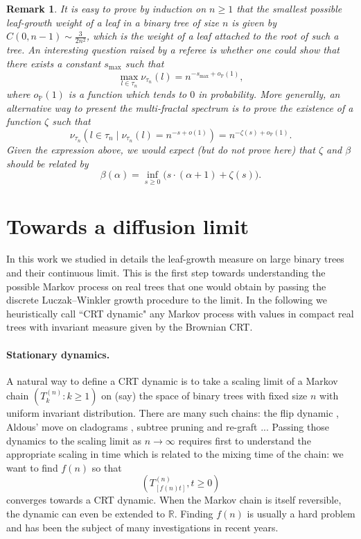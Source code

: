 \documentclass[11pt]{article}
\renewcommand{\geq}{\geqslant}
\newtheorem{rem}[thm]{Remark}
\begin{document}
\begin{rem}\label{rem:multi-fractal}It is easy to prove by induction on $n \geq 1$ that the smallest possible leaf-growth weight of a leaf in a binary tree of size $n$ is given by $C(0,n-1) \sim \frac{3}{2 n^2}$, which is the weight of a leaf attached to the root of such a tree. An interesting question raised by a referee is whether one could show that there exists a constant $s_{\max}$ such that 
$$ \max_{l \in \tau_n} \nu_{\tau_n}(l) = n^{-s_{\max} + o_{\mathbb{P}}(1)},$$ where $o_{\mathbb{P}}(1)$ is a function which tends to $0$ in probability. More generally, an alternative way to present the multi-fractal spectrum is to prove the existence of a function $\zeta$ such that 
$$ \nu_{\tau_n}(l \in \tau_n \mid \nu_{\tau_n}(l) = n^{-s+o(1)}) = n^{-\zeta(s)+o_{\mathbb{P}}(1)}.$$ Given the expression above, we would expect (but do not prove here) that $\zeta$ and $\beta$ should be related by 
$$ \beta(\alpha) = \inf_{s \geq 0} \big( s\cdot (\alpha+1) + \zeta(s)\big).$$
\end{rem}



\section{Towards a diffusion limit}
In this work we studied in details  the leaf-growth measure on large binary trees and their continuous limit. This is the first step towards understanding the possible  Markov process  on real trees that one would obtain by passing the discrete Luczak--Winkler growth procedure to the limit. In the following we heuristically call ``CRT dynamic" any Markov process with values in compact real trees with invariant measure given by the Brownian CRT. 

\bigskip


\paragraph{Stationary dynamics.} A natural way to define a CRT dynamic is to take a scaling limit of a Markov chain $(T^{(n)}_k : k \geq 1)$ on (say) the space of binary trees with fixed size $n$ with uniform  invariant distribution. There are many such chains: the flip dynamic \cite{mcshine1997mixing}, Aldous' move on cladograms \cite{lohr2020aldous,forman2023aldous}, subtree pruning and re-graft  \cite{EW06}... Passing those dynamics to the scaling limit as $n \to \infty$ requires first to understand the appropriate scaling in time which is related to the mixing time of the chain: we want to find $f(n)$ so that 
$$ \left( T^{(n)}_{[f(n)t]} , t \geq 0\right)$$ converges towards a CRT dynamic. When the Markov chain is itself reversible, the dynamic can even be extended to $ \mathbb{R}$. Finding $f(n)$ is usually a hard problem and has been the subject of many investigations in recent years. 
\end{document}
